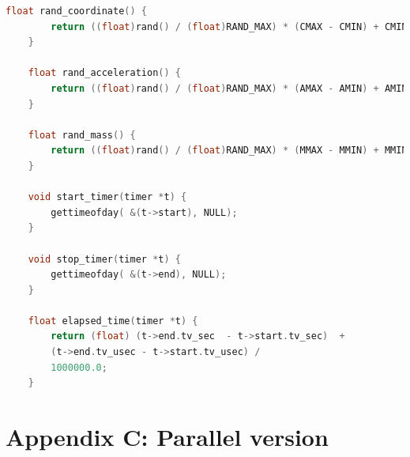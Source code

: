 \documentclass[11pt,a4paper]{article}
\begin{document}
\begin{lstlisting}[language=c]
	float rand_coordinate() {
		return ((float)rand() / (float)RAND_MAX) * (CMAX - CMIN) + CMIN;
	}
	
	float rand_acceleration() {
		return ((float)rand() / (float)RAND_MAX) * (AMAX - AMIN) + AMIN;
	}
	
	float rand_mass() { 
		return ((float)rand() / (float)RAND_MAX) * (MMAX - MMIN) + MMIN;
	}
	
	void start_timer(timer *t) {
		gettimeofday( &(t->start), NULL);
	}
	
	void stop_timer(timer *t) {
		gettimeofday( &(t->end), NULL);
	}
	
	float elapsed_time(timer *t) {
		return (float) (t->end.tv_sec  - t->start.tv_sec)  + 
		(t->end.tv_usec - t->start.tv_usec) /
		1000000.0;
	}
	\end{lstlisting}
	
	\section{Appendix C: Parallel version}
	
\end{document}
